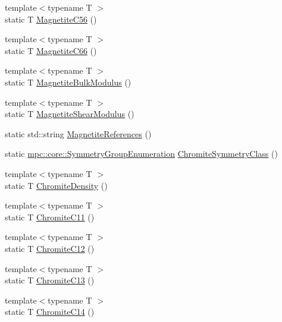 \begin{DoxyCompactItemize}
\item 
{\footnotesize template$<$typename T $>$ }\\static T \mbox{\hyperlink{namespacempc_1_1data_ac64f6a178aa0f2028fa0e3fbe0867e2e}{Magnetite\+C56}} ()
\item 
{\footnotesize template$<$typename T $>$ }\\static T \mbox{\hyperlink{namespacempc_1_1data_a25f06736932c21de684ed2f5126f2ab6}{Magnetite\+C66}} ()
\item 
{\footnotesize template$<$typename T $>$ }\\static T \mbox{\hyperlink{namespacempc_1_1data_a168099e03b574ce4a024d47e839c2e0c}{Magnetite\+Bulk\+Modulus}} ()
\item 
{\footnotesize template$<$typename T $>$ }\\static T \mbox{\hyperlink{namespacempc_1_1data_a7d7cc807c02b4ebc2867c6877743f2eb}{Magnetite\+Shear\+Modulus}} ()
\item 
static std\+::string \mbox{\hyperlink{namespacempc_1_1data_a4fdb455ebe0b37cdb5970d7463c4e4fb}{Magnetite\+References}} ()
\item 
static \mbox{\hyperlink{namespacempc_1_1core_a9d979684062547055a0ef5c13077bad8}{mpc\+::core\+::\+Symmetry\+Group\+Enumeration}} \mbox{\hyperlink{namespacempc_1_1data_a77b6c5a9fe1dd4cd6c0af98de6e10e4d}{Chromite\+Symmetry\+Class}} ()
\item 
{\footnotesize template$<$typename T $>$ }\\static T \mbox{\hyperlink{namespacempc_1_1data_a1a2609b6dd3748bba9ab4d11d72e12a0}{Chromite\+Density}} ()
\item 
{\footnotesize template$<$typename T $>$ }\\static T \mbox{\hyperlink{namespacempc_1_1data_a772db0b688f3ab098f19c1d793d0916e}{Chromite\+C11}} ()
\item 
{\footnotesize template$<$typename T $>$ }\\static T \mbox{\hyperlink{namespacempc_1_1data_aca6cedc684c7f451a3a1f11232dc46df}{Chromite\+C12}} ()
\item 
{\footnotesize template$<$typename T $>$ }\\static T \mbox{\hyperlink{namespacempc_1_1data_aa52f164f28212eb152ff6b3a3924cc54}{Chromite\+C13}} ()
\item 
{\footnotesize template$<$typename T $>$ }\\static T \mbox{\hyperlink{namespacempc_1_1data_aa6b3852313715c507d641e45dab23136}{Chromite\+C14}} ()
\item 

\end{DoxyCompactItemize}
